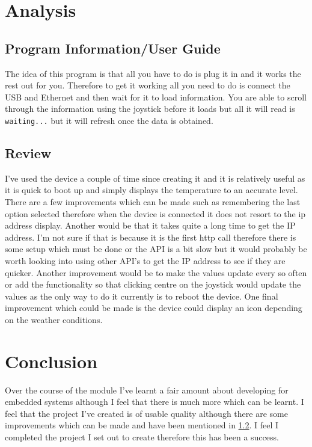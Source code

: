\documentclass[a4paper,12pt]{scrartcl}
\begin{document}
	\section{Analysis}
	{
		\subsection{Program Information/User Guide}
		{
			The idea of this program is that all you have to do is plug it in and it works the rest out for you. Therefore to get it working all you need to do is connect the USB and Ethernet and then wait for it to load information. You are able to scroll through the information using the joystick before it loads but all it will read is \lstinline|waiting...| but it will refresh once the data is obtained.
		}
		\subsection{Review}\label{sec:Review}
		{
			I've used the device a couple of time since creating it and it is relatively useful as it is quick to boot up and simply displays the temperature to an accurate level. There are a few improvements which can be made such as remembering the last option selected therefore when the device is connected it does not resort to the ip address display. Another would be that it takes quite a long time to get the IP address. I'm not sure if that is because it is the first http call therefore there is some setup which must be done or the API is a bit slow but it would probably be worth looking into using other API's to get the IP address to see if they are quicker. Another improvement would be to make the values update every so often or add the functionality so that clicking centre on the joystick would update the values as the only way to do it currently is to reboot the device. One final improvement which could be made is the device could display an icon depending on the weather conditions. 
		}
	}
	
	\section{Conclusion}
	{
		Over the course of the module I've learnt a fair amount about developing for embedded systems although I feel that there is much more which can be learnt. I feel that the  project I've created is of usable quality although there are some improvements which can be made and have been mentioned in \cref{sec:Review}. I feel I completed the project I set out to create therefore this has been a success.
	}
	
	\newpage
	
	\printbibliography[heading=bibintoc,title=References]
\end{document}

